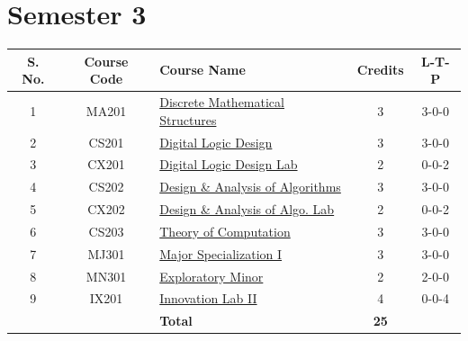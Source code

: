\newpage

\section*{Semester 3}
\begin{longtable}{|c|c|p{7cm}|c|c|}
\hline
\textbf{S. No.} & \textbf{Course Code} & \textbf{Course Name} & \textbf{Credits} & \textbf{L-T-P} \\
\hline
1 & MA201 & \hyperref[course:MA201]{Discrete Mathematical Structures} & 3 & 3-0-0 \\
\hline
2 & CS201 & \hyperref[course:CS201]{Digital Logic Design} & 3 & 3-0-0 \\
\hline
3 & CX201 & \hyperref[course:CX201]{Digital Logic Design Lab} & 2 & 0-0-2 \\
\hline
4 & CS202 & \hyperref[course:CS202]{Design \& Analysis of Algorithms} & 3 & 3-0-0 \\
\hline
5 & CX202 & \hyperref[course:CX202]{Design \& Analysis of Algo. Lab} & 2 & 0-0-2 \\
\hline
6 & CS203 & \hyperref[course:CS203]{Theory of Computation} & 3 & 3-0-0 \\
\hline
7 & MJ301 & \hyperref[table:major1]{Major Specialization I} & 3 & 3-0-0 \\
\hline
8 & MN301 & \hyperref[table:minor_l1]{Exploratory Minor} & 2 & 2-0-0 \\
\hline
9 & IX201 & \hyperref[course:IX201]{Innovation Lab II} & 4 & 0-0-4 \\
\hline
& & \textbf{Total} & \textbf{25} & \\
\hline
\end{longtable}

